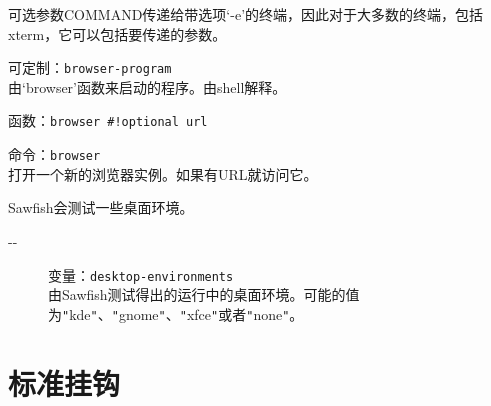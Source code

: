 \documentclass{book}
\begin{document}
\begin{CJK*}{UTF8}{gbsn}
\begin{description}
可选参数COMMAND传递给带选项`-e'的终端，因此对于大多数的终端，包括xterm，它可以包括要传递的参数。
\item[-{}-] 可定制：\verb|browser-program|\\
由`browser'函数来启动的程序。由shell解释。
\item[-{}-] 函数：\verb|browser #!optional url|
\item[-{}-] 命令：\verb|browser|\\
打开一个新的浏览器实例。如果有URL就访问它。
\end{description}

Sawfish会测试一些桌面环境。
\begin{description}
\item[-{}-] 变量：\verb|desktop-environments|\\
由Sawfish测试得出的运行中的桌面环境。可能的值为\verb|"|kde\verb|"|、\verb|"|gnome\verb|"|、\verb|"|xfce\verb|"|或者\verb|"|none\verb|"|。
\end{description}
\chapter{标准挂钩}
\end{CJK*}
\end{document}
